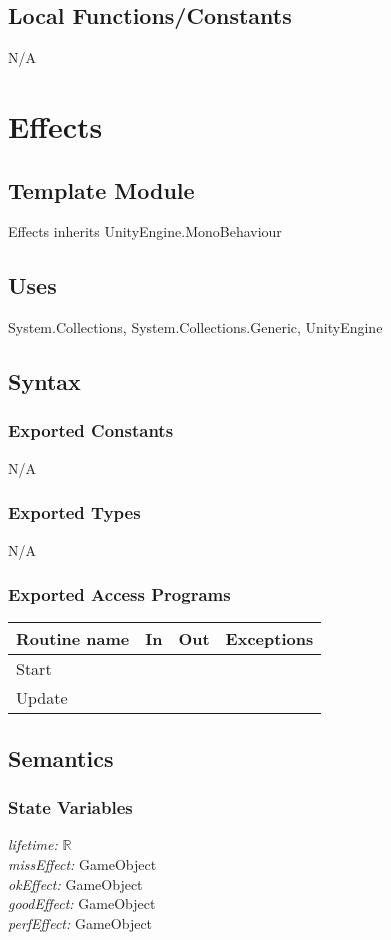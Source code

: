 \documentclass[12pt]{article}
\begin{document}
\subsection{Local Functions/Constants}
N/A

\newpage


\section{Effects}

\subsection{Template Module}
Effects inherits UnityEngine.MonoBehaviour

\subsection{Uses}
System.Collections, System.Collections.Generic, UnityEngine

\subsection{Syntax}
\subsubsection{Exported Constants}
N/A

\subsubsection{Exported Types}
N/A

\subsubsection{Exported Access Programs}
\begin{tabular}{| l | l | l | l |}
\hline
\textbf{Routine name} & \textbf{In} & \textbf{Out} & \textbf{Exceptions}\\
\hline
Start    &      &           &          \\
\hline
Update   &     &           &          \\
\hline
\end{tabular}

\subsection{Semantics}
\subsubsection{State Variables}
\textit{lifetime:} $\mathbb{R}$\\
\textit{missEffect:} GameObject\\
\textit{okEffect:} GameObject\\
\textit{goodEffect:} GameObject\\
\textit{perfEffect:} GameObject
\end{document}
